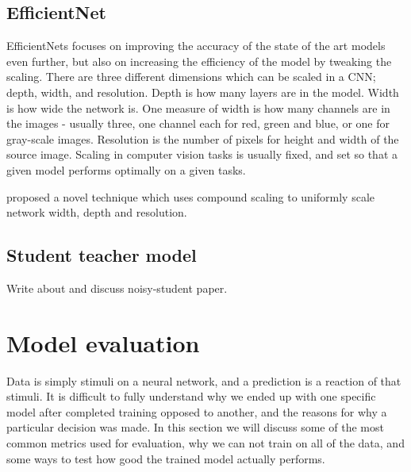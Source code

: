 \documentclass[thesis.tex]{subfiles}
\begin{document}
\subsection{EfficientNet}
EfficientNets \cite{EfficientNetRethinking19} focuses on improving the accuracy of the state of the art models even further, but also on increasing the efficiency of the model by tweaking the scaling. There are three different dimensions which can be scaled in a CNN; depth, width, and resolution. Depth is how many layers are in the model. Width is how wide the network is. One measure of width is how many channels are in the images - usually three, one  channel each for red, green and blue, or one for gray-scale images. Resolution is the number of pixels for height and width of the source image. Scaling in computer vision tasks is usually fixed, and set so that a given model performs optimally on a given tasks. 



\citeauthor*{EfficientNetRethinking19} proposed a novel technique which uses compound scaling to uniformly scale network width, depth and resolution.




\subsection{Student teacher model}
Write about and discuss noisy-student paper.





\section{Model evaluation}
Data is simply stimuli on a neural network, and a prediction is a reaction of that stimuli. It is difficult to fully understand why we ended up with one specific model after completed training opposed to another, and the reasons for why a particular decision was made. In this section we will discuss some of the most common metrics used for evaluation, why we can not train on all of the data, and some ways to test how good the trained model actually performs.
\end{document}
